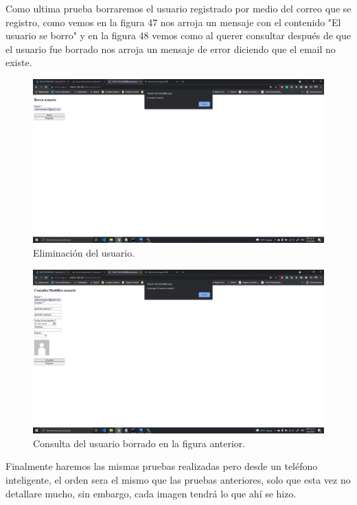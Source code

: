 \documentclass[11pt]{article}
\begin{document}
		Como ultima prueba borraremos el usuario registrado por medio del correo que se registro, como vemos en la figura 47 nos arroja un mensaje con el contenido "El usuario se borro" y en la figura 48 vemos como al querer consultar después de que el usuario fue borrado nos arroja un mensaje de error diciendo que el email no existe.
		\begin{figure}[H]
			\centering
			\includegraphics[scale=0.34]{resources/ULTIMO10.png}
			\caption{Eliminación del usuario.}\label{fig:picture}
		\end{figure}
		\begin{figure}[H]
			\centering
			\includegraphics[scale=0.34]{resources/ULTIMO10OK.png}
			\caption{Consulta del usuario borrado en la figura anterior.}\label{fig:picture}
		\end{figure}
		Finalmente haremos las mismas pruebas realizadas pero desde un teléfono inteligente, el orden sera el mismo que las pruebas anteriores, solo que esta vez no detallare mucho, sin embargo, cada imagen tendrá lo que ahí se hizo.
\end{document}
